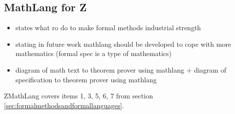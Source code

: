 \subsection{MathLang for Z}

\begin{itemize}
\item \cite{fmpresetation} states what ro do to make formal methods industrial strength

\item \cite{lamarphd} stating in future work mathlang should be developed to cope with more mathematics (formal spec is a type of mathematics)

\item diagram of math text to theorem prover using mathlang + diagram of specification to theorem prover using mathlang
\end{itemize}

ZMathLang covers items 1, 3, 5, 6, 7 from section \ref{sec:formalmethodsandformallanguages}.